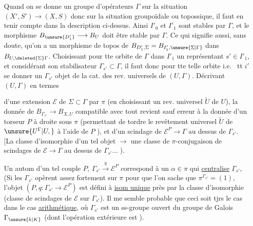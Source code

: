 Quand on se donne un groupe d'opérateurs \deleted{$\Sigma$}$\Gamma$ sur la situation $(X',S')\longrightarrow(X,S)$ donc sur la situation groupoïdale ou topossique, il faut en tenir compte dans la description ci-dessus.
Ainsi $I'_0$ et $I'_1$ sont stables par $\Gamma$, et le morphisme  $B_{\unsure{D'_1}}\longrightarrow B_U$ doit être stable par $\Gamma$.
Ce qui signifie aussi, sans doute, qu'on a un morphisme de topos de
$B_{D'_1,\Sigma}=B_{I'_1,\unsure{\Sigma|\Gamma}}$
dans $B_{U,\deleted{\Sigma}\Gamma}$.
Choisissant pour tte orbite de $\Gamma$ dans $I'_1$ un représentant $s'\in I'_1$, et considérant son stabilisateur $\Gamma_{s'}\subset\Gamma$, il faut donc pour tte telle orbite i.e.\  tt $i'$ se donner un $\Gamma_{s'}$ objet de la cat. des rev. universels de $(U,\Gamma)$.
  Décrivant $(U,\Gamma)$ en termes

d'une extension $\mathcal E$ de $\Sigma\subset\Gamma$ par $\pi$ (en choisissant un rev. universel $\widetilde U$ de $U$), la donnée de $B_{\Gamma_{s'}}\longrightarrow B_{X,U}$ compatible avec tout revient sauf erreur à la donnée d'un torseur $P$ à droite sous $\pi$ (permettant de tordre le revêtement universel  $\widetilde U$ de $\unsure{U^\Gamma|U,}$ à l'aide de $P$  ), et d'un scindage de $\mathcal E^P\longrightarrow\Gamma$ au dessus de $\Gamma_{s'}$.
[La classe d'isomorphie d'un tel objet $\longrightarrow$ une classe de $\pi$-conjugaison de scindages de $\mathcal E\longrightarrow\Gamma$ au dessus de $\Gamma_{s'}$... ).

Un autom d'un tel couple  $P,\ \Gamma_{s'}\xrightarrow{q}\mathcal E^P$ correspond à un $\alpha\in\pi$ qui \uline{centralise} $\Gamma_{s'}$,  (Si les $\Gamma_{s'}$ opèrent assez fortement sur $\pi$ pour que l'on sache que $\pi^{\Gamma_{s'}}=(1)$, l'objet $(P,q:\Gamma_{s'}\longrightarrow\mathcal E^P)$ est défini à \uline{isom unique} près par la classe d'isomorphie  (classe de scindages de $\mathcal E$ sur $\Gamma_{s'}$).
Il me semble probable que ceci soit tjrs le cas dans le cas \uline{arithmétique}, où $\Gamma_{s'}$ est un ss-groupe ouvert du groupe de Galois $\Gamma_{\unsure{k|K}}$ (dont l'opération extérieure est ).

